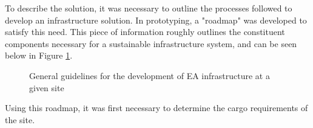 \documentclass[../main.tex]{subfiles}
\begin{document}
To describe the solution, it was necessary to outline the processes followed to develop an infrastructure solution. In prototyping, a "roadmap" was developed to satisfy this need. This piece of information roughly outlines the constituent components necessary for a sustainable infrastructure system, and can be seen below in Figure \ref{fig:roadmap}.
\begin{figure}[h!]
    \centering
    \caption{General guidelines for the development of EA infrastructure at a given site}
    \label{fig:roadmap}
    \centering
\end{figure}
\FloatBarrier
Using this roadmap, it was first necessary to determine the cargo requirements of the site.
\end{document}

